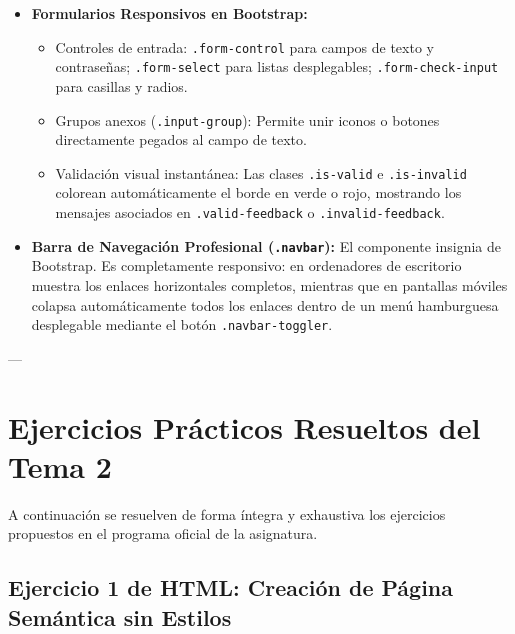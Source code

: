 \begin{itemize}[leftmargin=1.2cm]
\begin{itemize}
      \item Envoltura \texttt{<div class="table-responsive">}: Garantiza que en pantallas móviles la tabla genere una barra de desplazamiento horizontal suave sin romper el diseño de la página.
    \end{itemize}
  \item \textbf{Formularios Responsivos en Bootstrap:}
    \begin{itemize}
      \item Controles de entrada: \texttt{.form-control} para campos de texto y contraseñas; \texttt{.form-select} para listas desplegables; \texttt{.form-check-input} para casillas y radios.
      \item Grupos anexos (\texttt{.input-group}): Permite unir iconos o botones directamente pegados al campo de texto.
      \item Validación visual instantánea: Las clases \texttt{.is-valid} e \texttt{.is-invalid} colorean automáticamente el borde en verde o rojo, mostrando los mensajes asociados en \texttt{.valid-feedback} o \texttt{.invalid-feedback}.
    \end{itemize}
  \item \textbf{Barra de Navegación Profesional (\texttt{.navbar}):}
    El componente insignia de Bootstrap. Es completamente responsivo: en ordenadores de escritorio muestra los enlaces horizontales completos, mientras que en pantallas móviles colapsa automáticamente todos los enlaces dentro de un menú hamburguesa desplegable mediante el botón \texttt{.navbar-toggler}.
\end{itemize}

---

\section{Ejercicios Prácticos Resueltos del Tema 2}

A continuación se resuelven de forma íntegra y exhaustiva los ejercicios propuestos en el programa oficial de la asignatura.

\subsection{Ejercicio 1 de HTML: Creación de Página Semántica sin Estilos}

